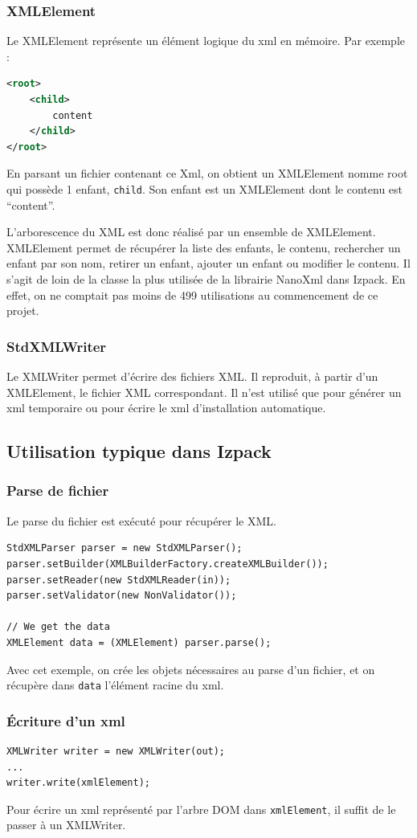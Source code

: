 \subsubsection{XMLElement}
Le XMLElement représente un élément logique du xml en mémoire. Par exemple :
\begin{lstlisting}[language=xml]
<root>
	<child>
		content
	</child>
</root>
\end{lstlisting}
En parsant un fichier contenant ce Xml, on obtient un XMLElement nomme root qui possède 1 enfant, \verb|child|. Son enfant est un XMLElement dont le contenu est ``content''.

L'arborescence du XML est donc réalisé par un ensemble de XMLElement.
XMLElement permet de récupérer la liste des enfants, le contenu, rechercher un enfant par son nom, retirer un enfant, ajouter un enfant ou modifier le contenu.
Il s'agit de loin de la classe la plus utilisée de la librairie NanoXml dans Izpack.
En effet, on ne comptait pas moins de 499 utilisations au commencement de ce projet.
\subsubsection{StdXMLWriter}
Le XMLWriter permet d'écrire des fichiers XML.
Il reproduit, à partir d'un XMLElement, le fichier XML correspondant.
Il n'est utilisé que pour générer un xml temporaire ou pour écrire le xml d'installation automatique.

\subsection{Utilisation typique dans Izpack}
\subsubsection{Parse de fichier}
Le parse du fichier est exécuté pour récupérer le XML.
\begin{lstlisting}
StdXMLParser parser = new StdXMLParser();
parser.setBuilder(XMLBuilderFactory.createXMLBuilder());
parser.setReader(new StdXMLReader(in));
parser.setValidator(new NonValidator());

// We get the data
XMLElement data = (XMLElement) parser.parse();
\end{lstlisting}
Avec cet exemple, on crée les objets nécessaires au parse d'un fichier, et on récupère dans \verb|data| l'élément racine du xml.

\subsubsection{Écriture d'un xml}
\begin{lstlisting}
XMLWriter writer = new XMLWriter(out);
...
writer.write(xmlElement);
\end{lstlisting}
Pour écrire un xml représenté par l'arbre DOM dans \verb|xmlElement|, il suffit de le passer à un XMLWriter.

